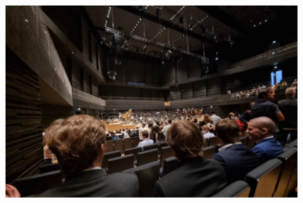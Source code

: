 \begin{figure}
	\center
	\includegraphics[width=0.8\linewidth]{./Bilder/1.0_unikonzert/3.voller_Saal.png} 
    
    \caption{}
\end{figure}